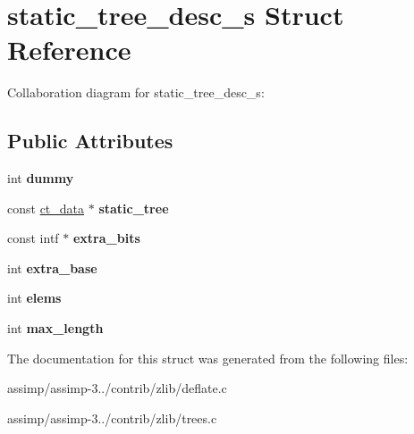 \hypertarget{structstatic__tree__desc__s}{\section{static\+\_\+tree\+\_\+desc\+\_\+s Struct Reference}
\label{structstatic__tree__desc__s}
}


Collaboration diagram for static\+\_\+tree\+\_\+desc\+\_\+s\+:
\subsection*{Public Attributes}
\begin{DoxyCompactItemize}
\item 
\hypertarget{structstatic__tree__desc__s_aa3662e0ed40c86de246851a7a2483308}{int {\bfseries dummy}}\label{structstatic__tree__desc__s_aa3662e0ed40c86de246851a7a2483308}

\item 
\hypertarget{structstatic__tree__desc__s_a6116ce0e39e87138cfb08dce7b1e42de}{const \hyperlink{structct__data__s}{ct\+\_\+data} $\ast$ {\bfseries static\+\_\+tree}}\label{structstatic__tree__desc__s_a6116ce0e39e87138cfb08dce7b1e42de}

\item 
\hypertarget{structstatic__tree__desc__s_a30bc89cdc889c9b6c2baf59590988a7a}{const intf $\ast$ {\bfseries extra\+\_\+bits}}\label{structstatic__tree__desc__s_a30bc89cdc889c9b6c2baf59590988a7a}

\item 
\hypertarget{structstatic__tree__desc__s_a1051cc83d9d410ccf21427df9bd85201}{int {\bfseries extra\+\_\+base}}\label{structstatic__tree__desc__s_a1051cc83d9d410ccf21427df9bd85201}

\item 
\hypertarget{structstatic__tree__desc__s_ab4bad1c091188c43413a09f626a5787f}{int {\bfseries elems}}\label{structstatic__tree__desc__s_ab4bad1c091188c43413a09f626a5787f}

\item 
\hypertarget{structstatic__tree__desc__s_ae767848725194f63fa9cf08142767ad4}{int {\bfseries max\+\_\+length}}\label{structstatic__tree__desc__s_ae767848725194f63fa9cf08142767ad4}

\end{DoxyCompactItemize}


The documentation for this struct was generated from the following files\+:\begin{DoxyCompactItemize}
\item 
assimp/assimp-\/3../contrib/zlib/deflate.\+c\item 
assimp/assimp-\/3../contrib/zlib/trees.\+c\end{DoxyCompactItemize}

